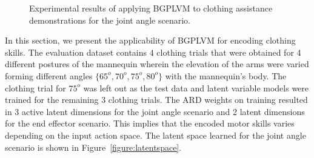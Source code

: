 \documentclass{article}
\begin{document}
\begin{figure}
  \centering
  \caption{Experimental results of applying BGPLVM to clothing assistance demonstrations for the joint angle scenario.}
  \label{figure:results}
\end{figure}

In this section, we present the applicability of BGPLVM for encoding clothing skills. The evaluation dataset contains 4 clothing trials that were obtained for 4 different postures of the mannequin wherein the elevation of the arms were varied forming different angles $\{65^o, 70^o, 75^o, 80^o\}$ with the mannequin's body. The clothing trial for $75^o$ was left out as the test data and latent variable models were trained for the remaining 3 clothing trials. The ARD weights on training resulted in 3 active latent dimensions for the joint angle scenario and 2 latent dimensions for the end effector scenario. This implies that the encoded motor skills varies depending on the input action space. The latent space learned for the joint angle scenario is shown in Figure~\ref{figure:latentspace}.
\end{document}
